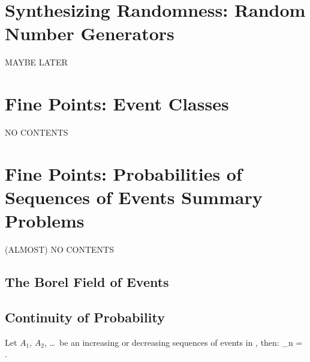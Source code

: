 \section{Synthesizing Randomness: Random Number Generators \optional}
MAYBE LATER

\section{Fine Points: Event Classes \optional}
\label{sec:fine-points-1}
NO CONTENTS

\section{Fine Points: Probabilities of Sequences of Events Summary Problems \optional}
\label{sec:fine-points-2}
(ALMOST) NO CONTENTS

\subsection{The Borel Field of Events}
\subsection{Continuity of Probability}
\begin{coro}
\label{coro-cont-prob-fcn}
Let $A_1$, $A_2$, \ldots\
be an increasing or decreasing sequences of events
in \evcl, then:
	\lim_{n\to\infty}  = .
\eeql

\end{coro}




